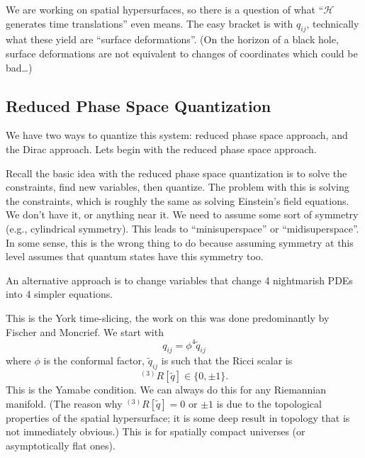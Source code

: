 We are working on spatial hypersurfaces, so there is a question of
what ``$\mathcal{H}$ generates time translations'' even means. The easy
bracket is with $q_{ij}$, technically what these yield are ``surface
deformations''.
(On the horizon of a black hole, surface deformations are not equivalent
to changes of coordinates which could be bad\dots)

\subsection{Reduced Phase Space Quantization}

We have two ways to quantize this system: reduced phase space approach,
and the Dirac approach. Lets begin with the reduced phase space
approach.

Recall the basic idea with the reduced phase space quantization is to
solve the constraints, find new variables, then quantize. The problem
with this is solving the constraints, which is roughly the same as
solving Einstein's field equations. We don't have it, or anything near
it. We need to assume some sort of symmetry (e.g., cylindrical
symmetry). This leads to ``minisuperspace'' or ``midisuperspace''.
In some sense, this is the wrong thing to do because assuming symmetry
at this level assumes that quantum states have this symmetry too.

An alternative approach is to change variables that change 4 nightmarish
PDEs into 4 simpler equations.

This is the York time-slicing,
the work on this was done predominantly by Fischer and Moncrief.
We start with
\begin{equation}
q_{ij} = \phi^{4}\widetilde{q}_{ij}
\end{equation}
where $\phi$ is the conformal factor, $\widetilde{q}_{ij}$ is such that
the Ricci scalar is
\begin{equation}
{{}^{(3)}}R[\widetilde{q}]\in\{0,\pm1\}.
\end{equation}
This is the Yamabe condition. We can always do this for any Riemannian
manifold.
(The reason why ${{}^{(3)}}R[\widetilde{q}]=0$ or $\pm1$ is due to the
topological properties of the spatial hypersurface; it is some deep
result in topology that is not immediately obvious.) This is for
spatially compact universes (or asymptotically flat ones).

